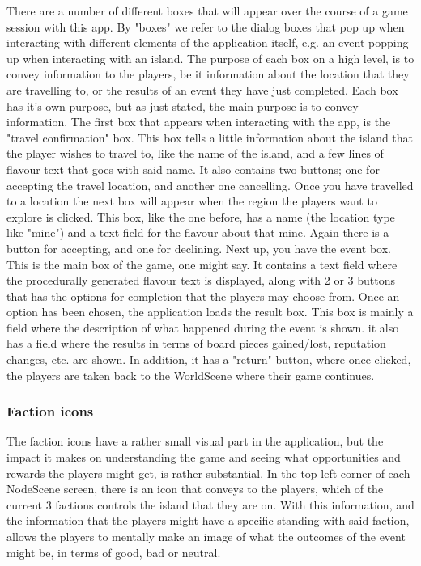 There are a number of different boxes that will appear over the course of a game session with this app. By "boxes" we refer to the dialog boxes that pop up when interacting with different elements of the application itself, e.g. an event popping up when interacting with an island.
The purpose of each box on a high level, is to convey information to the players, be it information about the location that they are travelling to, or the results of an event they have just completed.
Each box has it's own purpose, but as just stated, the main purpose is to convey information. The first box that appears when interacting with the app, is the "travel confirmation" box. This box tells a little information about the island that the player wishes to travel to, like the name of the island, and a few lines of flavour text that goes with said name. It also contains two buttons; one for accepting the travel location, and another one cancelling.
Once you have travelled to a location the next box will appear when the region the players want to explore is clicked. This box, like the one before, has a name (the location type like "mine") and a text field for the flavour about that mine. Again there is a button for accepting, and one for declining. 
Next up, you have the event box. This is the main box of the game, one might say. It contains a text field where the procedurally generated flavour text is displayed, along with 2 or 3 buttons that has the options for completion that the players may choose from. 
Once an option has been chosen, the application loads the result box. This box is mainly a field where the description of what happened during the event is shown. it also has a field where the results in terms of board pieces gained/lost, reputation changes, etc. are shown. In addition, it has a "return" button, where once clicked, the players are taken back to the WorldScene where their game continues.


\subsubsection{Faction icons}

The faction icons have a rather small visual part in the application, but the impact it makes on understanding the game and seeing what opportunities and rewards the players might get, is rather substantial. In the top left corner of each NodeScene screen, there is an icon that conveys to the players, which of the current 3 factions controls the island that they are on. With this information, and the information that the players might have a specific standing with said faction, allows the players to mentally make an image of what the outcomes of the event might be, in terms of good, bad or neutral.

